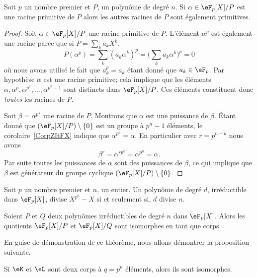 \begin{lemma}       \label{Lembcerei}
	Soit \( p\) un nombre premier et \( P\), un polynôme de degré \( n\). Si \( \alpha\in \eF_p[X]/P\) est une racine primitive de \( P\) alors les autres racines de \(P\) sont également primitives.
\end{lemma}

\begin{proof}
	Soit \( \alpha\in \eF_p[X]/P\) une racine primitive de \( P\). L'élément \( \alpha^p\) est également une racine parce que si \( P=\sum_ka_kX^k\),
	\begin{equation}
		P(\alpha^p)=\sum_k(a_k\alpha^k)^p=\big( \sum_ka_k\alpha^k \big)^p=0
	\end{equation}
	où nous avons utilisé le fait que \( a_k^p=a_k\) étant donné que \( a_k\in\eF_p\). Par hypothèse \( \alpha\) est une racine primitive; cela implique que les éléments \( \alpha,\alpha^p,\alpha^{p^2},\ldots,\alpha^{p^n-1}\) sont distincts dans \( \eF_p[X]/P\). Ces éléments constituent donc \emph{toutes} les racines de \( P\).

	Soit \( \beta=\alpha^{p^k}\) une racine de \( P\). Montrons que \( \alpha\) est une puissance de \( \beta\). Étant donné que \( (\eF_p[X]/P)\setminus\{ 0 \}\) est un groupe à \( p^n-1\) éléments, le corolaire~\ref{CorpZItFX} indique que \( \alpha^{p^n}=\alpha\). En particulier avec \( r=p^{n-k}\) nous avons
	\begin{equation}
		\beta^r=\alpha^{rp^k}=\alpha^{p^n}=\alpha.
	\end{equation}
	Par suite toutes les puissances de \( \alpha\) sont des puissances de \( \beta\), ce qui implique que \( \beta\) est générateur du groupe cyclique \( (\eF_p[X]/P)\setminus\{ 0 \}\).
\end{proof}

\begin{lemma}       \label{LemkzWjse}
	Soit \( p\) un nombre premier et \( n\), un entier. Un polynôme de degré \( d\), irréductible dans \( \eF_p[X]\), divise \( X^{p^n}-X\) si et seulement si, \( d\) divise \( n\).
\end{lemma}

\begin{theorem}
	Soient \( P\) et \( Q\) deux polynômes irréductibles de degré \( n\) dans \( \eF_p[X]\). Alors les quotients \( \eF_p[X]/P\) et \( \eF_p[X]/Q\) sont isomorphes en tant que corps.
\end{theorem}
En guise de démonstration de ce théorème, nous allons démontrer la proposition suivante.
\begin{proposition}      \label{PropCRPjZsp}
	Si \( \eK\) et \( \eL\) sont deux corps à \( q=p^n\) éléments, alors ils sont isomorphes.
\end{proposition}

